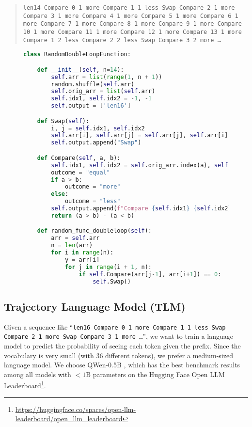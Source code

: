 \documentclass[pdflatex,sn-mathphys-num]{sn-jnl}%
\theoremstyle{thmstyleone}%
\theoremstyle{thmstyletwo}%
\theoremstyle{thmstylethree}%
\begin{document}
\begin{quote}
\texttt{len14 Compare 0 1 more Compare 1 1 less Swap Compare 2 1 more Compare 3 1 more Compare 4 1 more Compare 5 1 more Compare 6 1 more Compare 7 1 more Compare 8 1 more Compare 9 1 more Compare 10 1 more Compare 11 1 more Compare 12 1 more Compare 13 1 more Compare 1 2 less Compare 2 2 less Swap Compare 3 2 more \ldots}
\end{quote}

\begin{figure}[H]
    \centering
    \begin{lstlisting}[language=Python, caption={A randomly generated function with a double-loop}]
class RandomDoubleLoopFunction:

    def __init__(self, n=14):
        self.arr = list(range(1, n + 1))
        random.shuffle(self.arr)
        self.orig_arr = list(self.arr)
        self.idx1, self.idx2 = -1, -1
        self.output = ['len16']

    def Swap(self):
        i, j = self.idx1, self.idx2
        self.arr[i], self.arr[j] = self.arr[j], self.arr[i]
        self.output.append("Swap")

    def Compare(self, a, b):
        self.idx1, self.idx2 = self.orig_arr.index(a), self.orig_arr.index(b)
        outcome = "equal"
        if a > b: 
            outcome = "more"
        else: 
            outcome = "less"
        self.output.append(f"Compare {self.idx1} {self.idx2} {outcome}")
        return (a > b) - (a < b)

    def random_func_doubleloop(self):
        arr = self.arr
        n = len(arr)
        for i in range(n):
            y = arr[i]
            for j in range(i + 1, n):
                if self.Compare(arr[j-1], arr[i+1]) == 0:
                    self.Swap()
    \end{lstlisting}
\end{figure}

\subsection{Trajectory Language Model (TLM)} \label{ssec:tlm}

Given a sequence like ``\texttt{len16 Compare 0 1 more Compare 1 1 less Swap Compare 2 1 more Swap Compare 3 1 more \ldots }'', we want to train a language model to predict the probability of seeing each token given the prefix. Since the vocabulary is very small (with 36 different tokens), we prefer a medium-sized language model. We choose QWen-0.5B \cite{yang2024qwen25}, which has the best benchmark results among all models with $<1\text{B}$ parameters on the Hugging Face Open LLM Leaderboard\footnote{\url{https://huggingface.co/spaces/open-llm-leaderboard/open_llm_leaderboard}}. 
\end{document}

